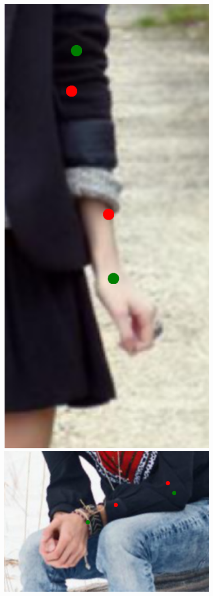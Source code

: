 \begin{figure}[t!]
    \includegraphics[height=\fh]{resources/Fixing/fix_12}
    \includegraphics[height=\fh]{resources/Fixing/fix_13}

\end{figure}

